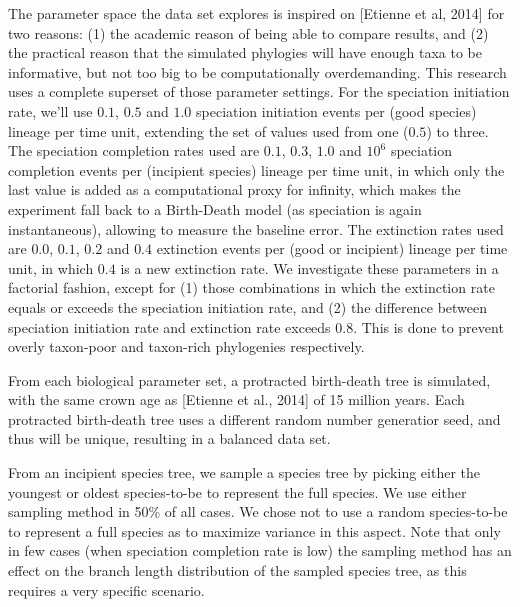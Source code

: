 \documentclass{article}
\begin{document}
The parameter space the data set explores is inspired on 
[Etienne et al, 2014] for two reasons: (1) the academic
reason of being able to compare results, and (2) the practical
reason that the simulated phylogies will have enough taxa to
be informative, but not too big to be computationally overdemanding.
This research uses a complete superset of those parameter settings.
For the speciation initiation rate, we'll use $0.1$, $0.5$ and $1.0$ 
speciation initiation events per (good species) lineage per time unit, 
extending the set of
values used from one ($0.5$) to three. 
The speciation completion
rates used are $0.1$, $0.3$, $1.0$ and $10^6$ speciation completion
events per (incipient species) lineage per time unit, in which only
the last value is added as a computational proxy for infinity, which
makes the experiment fall back to a Birth-Death model (as speciation
is again instantaneous), allowing to measure the baseline error.
The extinction rates used are $0.0$, $0.1$, $0.2$ and $0.4$ 
extinction events per (good or incipient) lineage per time unit,
in which $0.4$ is a new extinction rate.
We investigate these parameters in a factorial fashion, except for
(1) those combinations in which the extinction rate equals or exceeds
the speciation initiation rate, and (2) the difference between
speciation initiation rate and extinction rate exceeds 0.8. This is
done to prevent overly taxon-poor and taxon-rich phylogenies respectively.

From each biological parameter set, a protracted birth-death tree is simulated,
with the same crown age as [Etienne et al., 2014] of 15 million years. 
Each protracted birth-death tree uses a different random number
generatior seed, and thus will be unique, resulting in a balanced 
data set. 

From an incipient species tree, we sample a species tree
by picking either the youngest or oldest
species-to-be to represent the full species.
We use either sampling method in 50\% of all cases. We chose not to use
a random species-to-be to represent a full species as to maximize variance
in this aspect. Note that only in few cases (when speciation completion rate
is low) the sampling method has an effect on the branch length distribution
of the sampled species tree, as this requires a very specific scenario.
\end{document}
